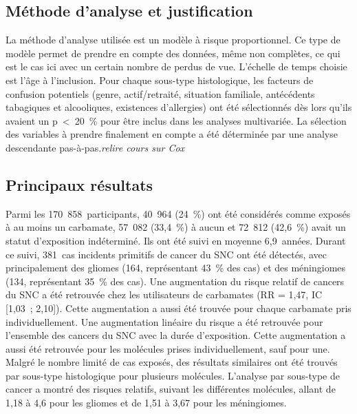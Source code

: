 \documentclass[10pt]{article}
\begin{document}
\subsection{Méthode d'analyse et justification}
La méthode d'analyse utilisée est un modèle à risque proportionnel. Ce type de modèle permet de prendre en compte des données, même non complètes, ce qui est le cas ici avec un certain nombre de perdus de vue. L'échelle de temps choisie est l'âge à l'inclusion. Pour chaque sous-type histologique, les facteurs de confusion potentiels (genre, actif/retraité, situation familiale, antécédents tabagiques et alcooliques, existences d'allergies) ont été sélectionnés dès lors qu'ils avaient un p~<~20~\% pour être inclus dans les analyses multivariée. La sélection des variables à prendre finalement en compte a été déterminée par une analyse descendante pas-à-pas.\emph{relire cours sur Cox}

\subsection{Principaux résultats}
Parmi les 170~858~participants, 40~964 (24~\%) ont été considérés comme exposés à au moins un carbamate, 57~082 (33,4~\%) à aucun et 72~812 (42,6~\%) avait un statut d'exposition indéterminé. Ils ont été suivi en moyenne 6,9~années. Durant ce suivi, 381~cas incidents primitifs de cancer du SNC ont été détectés, avec principalement des gliomes (164, représentant 43~\% des cas) et des méningiomes (134, représentant 35~\% des cas). Une augmentation du risque relatif de cancers du SNC a été retrouvée chez les utilisateurs de carbamates (RR = 1,47, IC [1,03~; 2,10]). Cette augmentation a aussi été trouvée pour chaque carbamate pris individuellement. Une augmentation linéaire du risque a été retrouvée pour l'ensemble des cancers du SNC avec la durée d'exposition. Cette augmentation a aussi été retrouvée pour les molécules prises individuellement, sauf pour une. Malgré le nombre limité de cas exposés, des résultats similaires ont été trouvés par sous-type histologique pour plusieurs molécules. L'analyse par sous-type de cancer a montré des risques relatifs, suivant les différentes molécules, allant de 1,18 à 4,6 pour les gliomes et de 1,51 à 3,67 pour les méningiomes.
\end{document}
